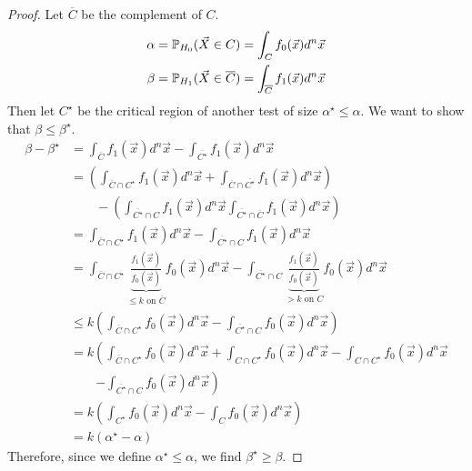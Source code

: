 \documentclass[../Main.tex]{subfiles}
\begin{document}
\begin{proof}
    Let $\overline{C}$ be the complement of $C$.
    \begin{align*}
        \alpha &= \P_{H_0}(\vec{X} \in C) = \int_C f_0(\vec{x}) d^n \vec{x} \\
        \beta &= \P_{H_1}(\vec{X} \in \overline{C}) = \int_{\overline{C}} f_1(\vec{x}) d^n \vec{x}
    \end{align*}
    Then let $C^\star$ be the critical region of another test of size $\alpha^\star \leq \alpha$. We want to show that $\beta \leq \beta^\star$.
    \begin{align*}
        \beta - \beta^\star &= \int_{\overline{C}} f_1(\vec{x}) d^n \vec{x} - \int_{\overline{C^\star}} f_1(\vec{x}) d^n \vec{x}\\
        &= \left(\int_{\overline{C} \cap C^\star} f_1(\vec{x}) d^n \vec{x} + \int_{\overline{C} \cap \overline{C^\star}} f_1(\vec{x}) d^n\vec{x}\right) \\
        &\qquad - \left(\int_{\overline{C^\star}\cap C} f_1(\vec{x}) d^n \vec{x} \int_{\overline{C^\star} \cap \overline{C}}f_1(\vec{x}) d^n\vec{x}\right)\\
        &= \int_{\overline{C} \cap C^\star} f_1(\vec{x}) d^n\vec{x} - \int_{\overline{C^\star} \cap C} f_1(\vec{x}) d^n\vec{x} \\
        &= \int_{\overline{C} \cap C^\star} \underbrace{\frac{f_1(\vec{x})}{f_0(\vec{x})}}_{\text{$\leq k$ on $\overline{C}$}} f_0(\vec{x}) d^n\vec{x} - \int_{\overline{C^\star} \cap C} \underbrace{\frac{f_1(\vec{x})}{f_0(\vec{x})}}_{\text{$> k$ on $C$}} f_0(\vec{x}) d^n\vec{x} \\
        &\leq k\left(\int_{\overline{C} \cap C^\star} f_0(\vec{x}) d^n\vec{x} - \int_{\overline{C^\star} \cap C} f_0(\vec{x}) d^n\vec{x}\right) \\
        &= k\left(\int_{\overline{C} \cap C^\star} f_0(\vec{x}) d^n\vec{x} + \int_{C \cap C^\star} f_0(\vec{x}) d^n\vec{x} - \int_{C \cap C^\star} f_0(\vec{x}) d^n\vec{x}\right.\\
        &\qquad\left. - \int_{\overline{C^\star} \cap C} f_0(\vec{x}) d^n\vec{x}\right) \\
        &= k\left(\int_{C^\star} f_0(\vec{x}) d^n\vec{x} - \int_C f_0(\vec{x}) d^n\vec{x}\right) \\
        &= k(\alpha^\star - \alpha)
    \end{align*}
    Therefore, since we define $\alpha^\star \leq \alpha$, we find $\beta^\star \geq \beta$.
\end{proof}
\end{document}

